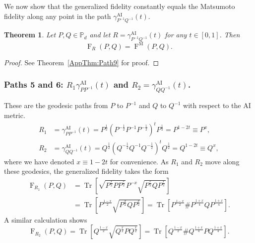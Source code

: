 \documentclass[12pt]{article}
\newtheorem{theorem}{Theorem}[section] %
\theoremstyle{definition}
\begin{document}
We now show that the generalized fidelity constantly equals the Matsumoto fidelity along any point in the path $\gamma_{ P ^{-1} Q ^{-1} }^{\mathrm{AI}}(t)$. 
\begin{theorembox} \label{Thm:Path9}
    \begin{theorem}
        Let $P, Q \in \mathbb P_d$ and let $R = \gamma_{P ^{-1} Q ^{-1} }^\mathrm{AI}(t)$ for any $t \in [0,1]$. Then 
        \begin{equation}
             \operatorname{F}_R(P,Q) = \operatorname{F}^\mathrm M(P,Q).
        \end{equation}
    \end{theorem}
\end{theorembox}
\begin{proof}
    See Theorem~\ref{AppThm:Path9} for proof.
\end{proof}
                                                                

\subsubsection*{Paths 5 and 6: $R_1 \gamma^\mathrm{AI}_{P P^{-1}}(t)$ and $R_2 = \gamma^\mathrm{AI}_{Q Q^{-1}}(t)$. } \label{SubSec:PolarPaths}

These are the geodesic paths from $P$ to $P^{-1}$ and $Q$ to $Q^{-1}$ with respect to the AI metric.
\begin{equation}
\begin{aligned}
R_1 &= \gamma^\mathrm{AI}_{P P^{-1}}(t) = P^{\frac 12} \left(P^{-\frac 12} P^{-1} P^{-\frac 12}\right)^t P^{\frac 12}  = P^{1-2t} \equiv P^x, \\
R_2 &= \gamma^\mathrm{AI}_{Q Q^{-1}}(t) = Q^{\frac 12} \left(Q^{-\frac 12} Q^{-1} Q^{-\frac 12}\right)^t Q^{\frac 12}  = Q^{1-2t} \equiv Q^x,
\end{aligned}
\end{equation}
where we have denoted $x \equiv  1 - 2t$ for convenience. As $R_1$ and $R_2$ move along these geodesics, the generalized fidelity takes the form
\begin{equation}
\begin{aligned}
        \operatorname{F}_{R_1}(P,Q) &= \operatorname{Tr}\left[\sqrt{ P^{\frac x2} P P^{\frac x2}} P^{-x}\sqrt{ P^{\frac x2} Q P^{\frac x2}}  \right] \\ &=   \operatorname{Tr} \left[P^{\frac{1-x}2} \sqrt{P^{\frac x2}Q P^{\frac x2}} \right] = \operatorname{Tr}\left[P^\frac{1-x}2 \# P^\frac{1+x}4 Q  P^\frac{1+x}4 \right]. 
\end{aligned}
\end{equation}
A similar calculation shows
\begin{equation}
    \operatorname{F}_{R_2}(P,Q) = \operatorname{Tr}\left[Q^{\frac{1-x}2}\sqrt{Q^\frac{x}{2} P Q^\frac{x}{2}}\right] = \operatorname{Tr}\left[Q^\frac{1-x}2 \# Q^\frac{1+x}4 P Q^\frac{1+x}4\right]. 
\end{equation}
\end{document}
